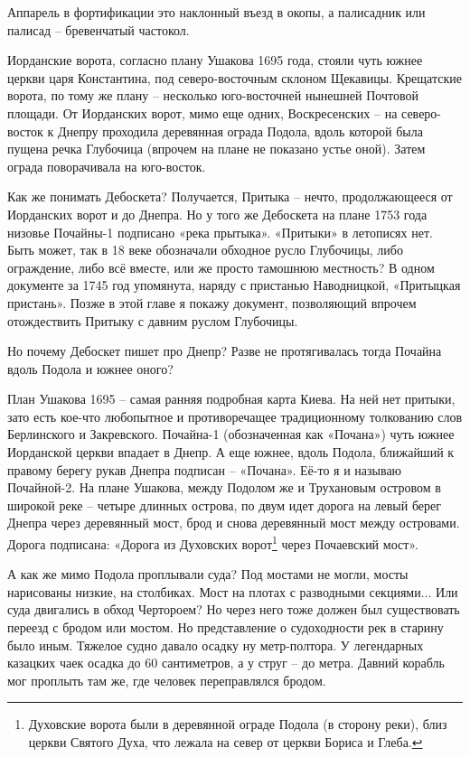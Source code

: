 Аппарель в фортификации это наклонный въезд в окопы, а палисадник или палисад – бревенчатый частокол.

Иорданские ворота, согласно плану Ушакова 1695 года, стояли чуть южнее церкви царя Константина, под северо-восточным склоном Щекавицы. Крещатские ворота, по тому же плану – несколько юго-восточней нынешней Почтовой площади. От Иорданских ворот, мимо еще одних, Воскресенских – на северо-восток к Днепру проходила деревянная ограда Подола, вдоль которой была пущена речка Глубочица (впрочем на плане не показано устье оной). Затем ограда поворачивала на юго-восток.

Как же понимать Дебоскета? Получается, Притыка – нечто, продолжающееся от Иорданских ворот и до Днепра. Но у того же Дебоскета на плане 1753 года низовье Почайны-1 подписано «река прытыка». «Притыки» в летописях нет. Быть может, так в 18 веке обозначали обходное русло Глубочицы, либо ограждение, либо всё вместе, или же просто тамошнюю местность? В одном документе за 1745 год упомянута, наряду с пристанью Наводницкой, «Притыцкая пристань». Позже в этой главе я покажу документ, позволяющий впрочем отождествить Притыку с давним руслом Глубочицы.

Но почему Дебоскет пишет про Днепр? Разве не протягивалась тогда Почайна вдоль Подола и южнее оного?
 
План Ушакова 1695 – самая ранняя подробная карта Киева. На ней нет притыки, зато есть кое-что любопытное и противоречащее традиционному толкованию слов Берлинского и Закревского. Почайна-1 (обозначенная как «Почана») чуть южнее Иорданской церкви впадает в Днепр. А еще южнее, вдоль Подола, ближайший к правому берегу рукав Днепра подписан – «Почана». Её-то я и называю Почайной-2. 
На плане Ушакова, между Подолом же и Трухановым островом в широкой реке – четыре длинных острова, по двум идет дорога на левый берег Днепра через деревянный мост, брод и снова деревянный мост между островами. Дорога подписана: «Дорога из Духовских ворот\footnote{Духовские ворота были в деревянной ограде Подола (в сторону реки), близ церкви Святого Духа, что лежала на север от церкви Бориса и Глеба.} через Почаевский мост».

А как же мимо Подола проплывали суда? Под мостами не могли, мосты нарисованы низкие, на столбиках. Мост на плотах с разводными секциями... Или суда двигались в обход Чертороем? Но через него тоже должен был существовать переезд с бродом или мостом. Но представление о судоходности рек в старину было иным. Тяжелое судно давало осадку ну метр-полтора. У легендарных казацких чаек осадка до 60 сантиметров, а у струг – до метра. Давний корабль мог проплыть там же, где человек переправлялся бродом.

